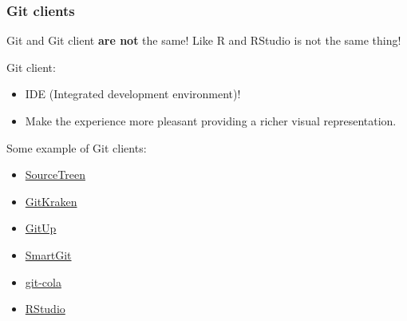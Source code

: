 \documentclass[svgnames]{beamer}
\begin{document}
\begin{frame}
    \frametitle{Git clients}

    Git and Git client \textbf{are not} the same! Like R and RStudio is not the same thing!
    \hfill \break

    Git client:
    \begin{itemize}
        \item IDE (Integrated development environment)!
        \item Make the experience more pleasant providing a richer visual representation.
    \end{itemize}

    \hfill 

    Some example of Git clients:
    \begin{itemize}
        \item \href{https://www.sourcetreeapp.com/}{ SourceTreen} 
        \item \href{https://www.gitkraken.com/}{ GitKraken}
        \item \href{https://gitup.co/}{ GitUp} 
        \item \href{https://www.syntevo.com/smartgit/}{ SmartGit} 
        \item \href{https://git-cola.github.io/}{ git-cola} 
        \item \href{https://www.rstudio.com/}{ RStudio}
    \end{itemize}

    \vspace{3em}

\end{frame}
\end{document}
